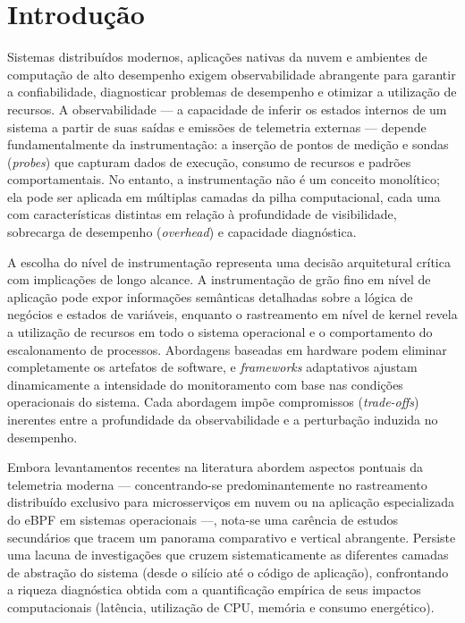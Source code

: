 \documentclass[sigconf, anonymous]{acmart}
\begin{document}
\maketitle

\section{Introdução}

Sistemas distribuídos modernos, aplicações nativas da nuvem e ambientes de computação de alto desempenho exigem observabilidade abrangente para garantir a confiabilidade, diagnosticar problemas de desempenho e otimizar a utilização de recursos. A observabilidade — a capacidade de inferir os estados internos de um sistema a partir de suas saídas e emissões de telemetria externas — depende fundamentalmente da instrumentação: a inserção de pontos de medição e sondas (\textit{probes}) que capturam dados de execução, consumo de recursos e padrões comportamentais. No entanto, a instrumentação não é um conceito monolítico; ela pode ser aplicada em múltiplas camadas da pilha computacional, cada uma com características distintas em relação à profundidade de visibilidade, sobrecarga de desempenho (\textit{overhead}) e capacidade diagnóstica.

A escolha do nível de instrumentação representa uma decisão arquitetural crítica com implicações de longo alcance. A instrumentação de grão fino em nível de aplicação pode expor informações semânticas detalhadas sobre a lógica de negócios e estados de variáveis, enquanto o rastreamento em nível de kernel revela a utilização de recursos em todo o sistema operacional e o comportamento do escalonamento de processos. Abordagens baseadas em hardware podem eliminar completamente os artefatos de software, e \textit{frameworks} adaptativos ajustam dinamicamente a intensidade do monitoramento com base nas condições operacionais do sistema. Cada abordagem impõe compromissos (\textit{trade-offs}) inerentes entre a profundidade da observabilidade e a perturbação induzida no desempenho.

Embora levantamentos recentes na literatura abordem aspectos pontuais da telemetria moderna — concentrando-se predominantemente no rastreamento distribuído exclusivo para microsserviços em nuvem ou na aplicação especializada do eBPF em sistemas operacionais —, nota-se uma carência de estudos secundários que tracem um panorama comparativo e vertical abrangente. Persiste uma lacuna de investigações que cruzem sistematicamente as diferentes camadas de abstração do sistema (desde o silício até o código de aplicação), confrontando a riqueza diagnóstica obtida com a quantificação empírica de seus impactos computacionais (latência, utilização de CPU, memória e consumo energético).
\end{document}
